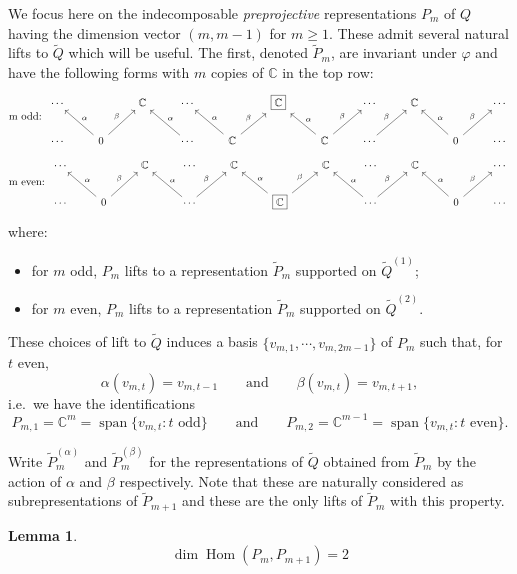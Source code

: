 \documentclass{amsart}
\newtheorem{lemma}[theorem]{Lemma}
\numberwithin{equation}{section}
\newcommand{\CC}{\mathbb{C}}
\newcommand{\Hom}{\operatorname{Hom}}
\newcommand{\Span}{\operatorname{span}}
\begin{document}
  We focus here on the indecomposable \emph{preprojective} representations $P_m$ of $Q$ having the dimension vector $(m,m-1)$ for $m\ge1$.
  These admit several natural lifts to $\widetilde Q$ which will be useful.
  The first, denoted $\widetilde P_m$, are invariant under $\varphi$ and have the following forms with $m$ copies of $\CC$ in the top row:
  \[
    \text{m odd: }
    \begin{tikzcd}
      \cdots & & \CC & \cdots & & \fbox{$\CC$} & & \cdots & \CC & & \cdots \\
      \cdots & 0 \arrow["\alpha"']{ul} \arrow["\beta"]{ur} & & \cdots \arrow["\alpha"']{ul} & \CC \arrow["\alpha"']{ul} \arrow["\beta"]{ur} & & \CC \arrow["\alpha"']{ul} \arrow["\beta"]{ur} & \cdots \arrow["\beta"]{ur} & & 0 \arrow["\alpha"']{ul} \arrow["\beta"]{ur} & \cdots
    \end{tikzcd}
  \]
  \[
    \text{m even: }
    \begin{tikzcd}
      \cdots & & \CC & \cdots & \CC & & \CC & \cdots & \CC & & \cdots \\
      \cdots & 0 \arrow["\alpha"']{ul} \arrow["\beta"]{ur} & & \cdots \arrow["\alpha"']{ul} \arrow["\beta"]{ur} & & \fbox{$\CC$} \arrow["\alpha"']{ul} \arrow["\beta"]{ur} & & \cdots \arrow["\alpha"']{ul} \arrow["\beta"]{ur} & & 0 \arrow["\alpha"']{ul} \arrow["\beta"]{ur} & \cdots
    \end{tikzcd}
  \]
  where:
  \begin{itemize}
    \item for $m$ odd, $P_m$ lifts to a representation $\widetilde P_m$ supported on $\widetilde Q^{(1)}$;
    \item for $m$ even, $P_m$ lifts to a representation $\widetilde P_m$ supported on $\widetilde Q^{(2)}$.
  \end{itemize}

  These choices of lift to $\widetilde Q$ induces a basis $\{v_{m,1},\cdots,v_{m,2m-1}\}$ of $P_m$ such that, for $t$ even, 
  \[\alpha(v_{m,t})=v_{m,t-1} \qquad \text{and} \qquad \beta(v_{m,t})=v_{m,t+1},\]
  i.e.\ we have the identifications
  \[P_{m,1}=\CC^m=\Span\{v_{m,t}:\text{$t$ odd}\}\qquad\text{and}\qquad P_{m,2}=\CC^{m-1}=\Span\{v_{m,t}:\text{$t$ even}\}.\]

  Write $\widetilde P_m^{(\alpha)}$ and $\widetilde P_m^{(\beta)}$ for the representations of $\widetilde Q$ obtained from $\widetilde P_m$ by the action of $\alpha$ and $\beta$ respectively.
  Note that these are naturally considered as subrepresentations of $\widetilde P_{m+1}$ and these are the only lifts of $\widetilde P_m$ with this property.
  \begin{lemma}
    \[\dim\Hom(P_m,P_{m+1})=2\]
  \end{lemma}
\end{document}
